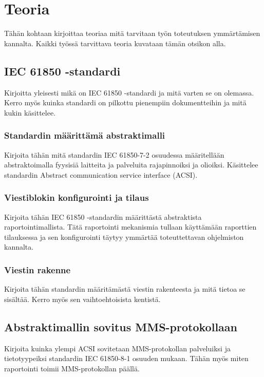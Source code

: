 \chapter{Teoria}
\label{ch:teoria}
\begin{it}
	Tähän kohtaan kirjoittaa teoriaa mitä tarvitaan työn toteutuksen ymmärtämisen kannalta. Kaikki työssä tarvittava teoria kuvataan tämän otsikon alla.
\end{it}

\section{IEC 61850 -standardi}
\begin{it}
	Kirjoitta yleisesti mikä on IEC 61850 -standardi ja mitä varten se on olemassa. Kerro myös kuinka standardi on pilkottu pienempiin dokumentteihin ja mitä kukin käsittelee.
\end{it}

\subsection{Standardin määrittämä abstraktimalli}
\begin{it}
	Kirjoita tähän mitä standardin IEC 61850-7-2 osuudessa määritellään abstraktoimalla fyysisiä laitteita ja palveluita rajapinnoiksi ja olioiksi. Käsittelee standardin Abstract communication service interface (ACSI).
\end{it}

\subsection{Viestiblokin konfigurointi ja tilaus}
\begin{it}
	Kirjoita tähän IEC 61850 -standardin määrittästä abstraktista raportointimallista. Tätä raportointi mekanismia tullaan käyttämään raporttien tilauksessa ja sen konfigurointi täytyy ymmärtää toteuttettavan ohjelmiston kannalta.
\end{it}

\subsection{Viestin rakenne}
\begin{it}
	Kirjoita tähän standardin määritämästä viestin rakenteesta ja mitä tietoa se sisältää. Kerro myös sen vaihtoehtoisista kentistä.
\end{it}

\section{Abstraktimallin sovitus MMS-protokollaan}
\begin{it}
	Kirjoita kuinka ylempi ACSI sovitetaan MMS-protokollan palveluiksi ja tietotyypeiksi standardin IEC 61850-8-1 osuuden mukaan. Tähän myös miten raportointi toimii MMS-protokollan päällä.
\end{it}

